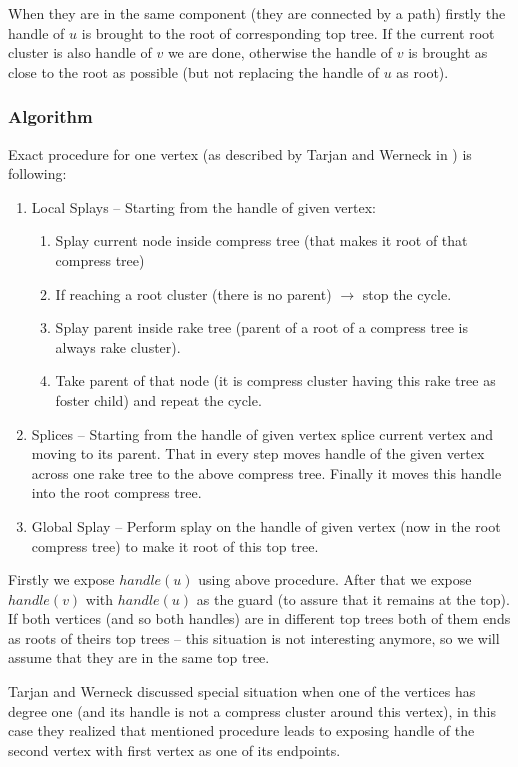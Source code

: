 When they are in the same component (they are connected by a path) firstly the
handle of $u$ is brought to the root of corresponding top tree. If the current
root cluster is also handle of $v$ we are done, otherwise the handle of $v$ is
brought as close to the root as possible (but not replacing the handle of $u$ as
root).

\subsubsection{Algorithm}

Exact procedure for one vertex (as described by Tarjan and Werneck in
\cite{SelfAdjustingTT}) is following:

\begin{enumerate}
\item Local Splays -- Starting from the handle of given vertex:
  \begin{enumerate}
  \item Splay current node inside compress tree (that makes it root of that compress tree)
  \item If reaching a root cluster (there is no parent) $\rightarrow$ stop the cycle.
  \item Splay parent inside rake tree (parent of a root of a compress tree is always rake cluster).
  \item Take parent of that node (it is compress cluster having this rake tree as foster child)
  and repeat the cycle.
  \end{enumerate}
\item Splices -- Starting from the handle of given vertex splice current vertex and
moving to its parent. That in every step moves handle of the given vertex across
one rake tree to the above compress tree. Finally it moves this handle into the
root compress tree.
\item Global Splay -- Perform splay on the handle of given vertex (now in the
root compress tree) to make it root of this top tree.
\end{enumerate}

Firstly we expose $handle(u)$ using above procedure. After that we expose
$handle(v)$ with $handle(u)$ as the guard (to assure that it remains at the
top). If both vertices (and so both handles) are in different top trees both of
them ends as roots of theirs top trees -- this situation is not interesting
anymore, so we will assume that they are in the same top tree.

Tarjan and Werneck discussed special situation when one of the vertices has
degree one (and its handle is not a compress cluster around this vertex), in
this case they realized that mentioned procedure leads to exposing handle of the
second vertex with first vertex as one of its endpoints.

